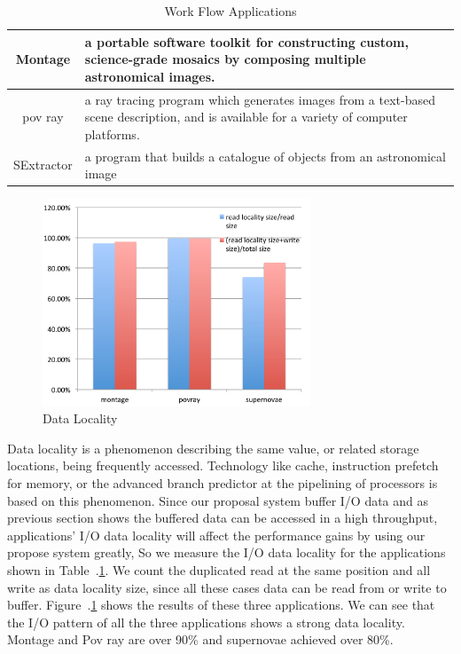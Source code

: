 \begin{table}
\centering
\begin{tabular}{|c|p{150pt}|}
\hline
Montage		&		a portable software toolkit for constructing custom, science-grade 
mosaics by composing multiple astronomical images\cite{montage}.\\\hline
pov ray		&		a ray tracing program which generates images from a text-based scene description, and is
available for a variety of computer platforms\cite{povray}.\\\hline
SExtractor	&	a program that builds a catalogue of objects from an astronomical image	\\%
\hline
\end{tabular}
\caption{Work Flow Applications}
\label{background:work flow applications}
\end{table}

\begin{figure}
\centering
\includegraphics[width=8cm]{img/data_locality.pdf}
\caption{Data Locality}
\label{background:data locality}
\end{figure}

Data locality is a phenomenon describing the same value, or related storage locations, being
frequently accessed.
Technology like cache, instruction prefetch for memory, or the advanced branch predictor
at the pipelining of processors is based on this phenomenon.
Since our proposal system buffer I/O data and as previous section shows the buffered data can be
accessed in a high throughput, applications' I/O data locality will affect the performance gains by
using our propose system greatly, So we measure the I/O data locality for the applications shown in
Table~.\ref{background:work flow applications}.
We count the duplicated read at the same position and all write as data locality size, since all
these cases data can be read from or write to buffer.
Figure~.\ref{background:data locality} shows the results of these three applications.
We can see
that the I/O pattern of all the three applications shows a strong data locality. Montage and Pov ray
are over 90\% and supernovae achieved over 80\%.


